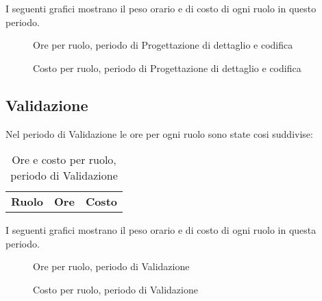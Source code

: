 I seguenti grafici mostrano il peso orario e di costo di ogni ruolo in questo periodo.

\begin{figure}[H]
\begin{tikzpicture}

	

\end{tikzpicture}
\caption{Ore per ruolo, periodo di Progettazione di dettaglio e codifica}
\end{figure}

\begin{figure}[H]
\begin{tikzpicture}

	

\end{tikzpicture}
\caption{Costo per ruolo, periodo di Progettazione di dettaglio e codifica}
\end{figure}

\subsection{Validazione}

Nel periodo di Validazione le ore per ogni ruolo sono state cosi suddivise:

\begin{table}[H]
	\centering
	\begin{tabular}{ l c c }
	\textbf{Ruolo} & \textbf{Ore} & \textbf{Costo} \\
	
		
	
	\end{tabular}
	\caption{Ore e costo per ruolo, periodo di Validazione}
	\end{table}

I seguenti grafici mostrano il peso orario e di costo di ogni ruolo in questa periodo.

\begin{figure}[H]
\begin{tikzpicture}

	

\end{tikzpicture}\caption{Ore per ruolo, periodo di Validazione}
\end{figure}

\begin{figure}[H]
\begin{tikzpicture}

	

\end{tikzpicture}
\caption{Costo per ruolo, periodo di Validazione}
\end{figure}

